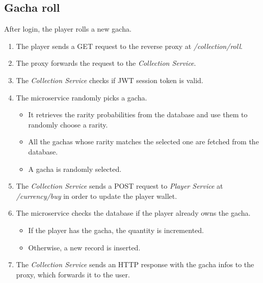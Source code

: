 \documentclass{article}
\begin{document}
\subsection{Gacha roll}
After login, the player rolls a new gacha.
\begin{enumerate}
    \item The player sends a GET request to the reverse proxy at \emph{/collection/roll}.
    \item The proxy forwards the request to the \emph{Collection Service}.
    \item The \emph{Collection Service} checks if JWT session token is valid.
    \item The microservice randomly picks a gacha.
          \begin{itemize}
              \item It retrieves the rarity probabilities from the database and use them to randomly choose a rarity.
              \item All the gachas whose rarity matches the selected one are fetched from the database.
              \item A gacha is randomly selected.
          \end{itemize}
    \item The \emph{Collection Service} sends a POST request to \emph{Player Service} at \emph{/currency/buy} in order to update the player wallet.
    \item The microservice checks the database if the player already owns the gacha.
          \begin{itemize}
              \item If the player has the gacha, the quantity is incremented.
              \item Otherwise, a new record is inserted.
          \end{itemize}
    \item The \emph{Collection Service} sends an HTTP response with the gacha infos to the proxy, which forwards it to the user.
\end{enumerate}
\end{document}
